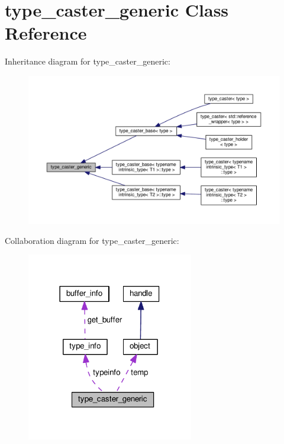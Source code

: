 \hypertarget{classtype__caster__generic}{}\section{type\+\_\+caster\+\_\+generic Class Reference}
\label{classtype__caster__generic}


Inheritance diagram for type\+\_\+caster\+\_\+generic\+:
\nopagebreak
\begin{figure}[H]
\begin{center}
\leavevmode
\includegraphics[width=350pt]{classtype__caster__generic__inherit__graph}
\end{center}
\end{figure}


Collaboration diagram for type\+\_\+caster\+\_\+generic\+:
\nopagebreak
\begin{figure}[H]
\begin{center}
\leavevmode
\includegraphics[width=206pt]{classtype__caster__generic__coll__graph}
\end{center}
\end{figure}
